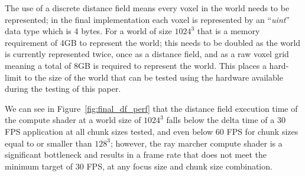 The use of a discrete distance field means every voxel in the world needs to be represented; in the final implementation
each voxel is represented by an ``\textit{uint}'' data type which is 4 bytes. For a world of size $1024^3$ that is a
memory requirement of 4GB to represent the world; this needs to be doubled as the world is currently represented
twice, once as a distance field, and as a raw voxel grid meaning a total of 8GB is required to represent the world. This
places a hard-limit to the size of the world that can be tested using the hardware available during the testing of this
paper.

We can see in Figure~\ref{fig:final_df_perf} that the distance field execution time of the compute shader at a world
size of $1024^3$ falls below the delta time of a 30 FPS application at all chunk sizes tested, and even below 60 FPS
for chunk sizes equal to or smaller than $128^3$; however, the ray marcher compute shader is a significant bottleneck
and results in a frame rate that does not meet the minimum target of 30 FPS, at any focus size and chunk size
combination.

